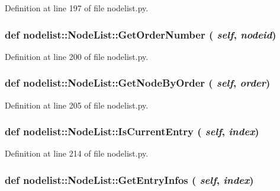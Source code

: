 Definition at line 197 of file nodelist.py.\hypertarget{classnodelist_1_1NodeList_f8812726aa6302532b6c13a2719b1258}{
\subsubsection[GetOrderNumber]{\setlength{\rightskip}{0pt plus 5cm}def nodelist::Node\-List::Get\-Order\-Number ( {\em self},  {\em nodeid})}}
\label{classnodelist_1_1NodeList_f8812726aa6302532b6c13a2719b1258}




Definition at line 200 of file nodelist.py.\hypertarget{classnodelist_1_1NodeList_abd3493e147587b88b12e4a6ac7f54e0}{
\subsubsection[GetNodeByOrder]{\setlength{\rightskip}{0pt plus 5cm}def nodelist::Node\-List::Get\-Node\-By\-Order ( {\em self},  {\em order})}}
\label{classnodelist_1_1NodeList_abd3493e147587b88b12e4a6ac7f54e0}




Definition at line 205 of file nodelist.py.\hypertarget{classnodelist_1_1NodeList_c44eb93f2e274ab9e3f47380d71d4aef}{
\subsubsection[IsCurrentEntry]{\setlength{\rightskip}{0pt plus 5cm}def nodelist::Node\-List::Is\-Current\-Entry ( {\em self},  {\em index})}}
\label{classnodelist_1_1NodeList_c44eb93f2e274ab9e3f47380d71d4aef}




Definition at line 214 of file nodelist.py.\hypertarget{classnodelist_1_1NodeList_04ede866c9b3431700c7ff4dd87fc67c}{
\subsubsection[GetEntryInfos]{\setlength{\rightskip}{0pt plus 5cm}def nodelist::Node\-List::Get\-Entry\-Infos ( {\em self},  {\em index})}}
\label{classnodelist_1_1NodeList_04ede866c9b3431700c7ff4dd87fc67c}




